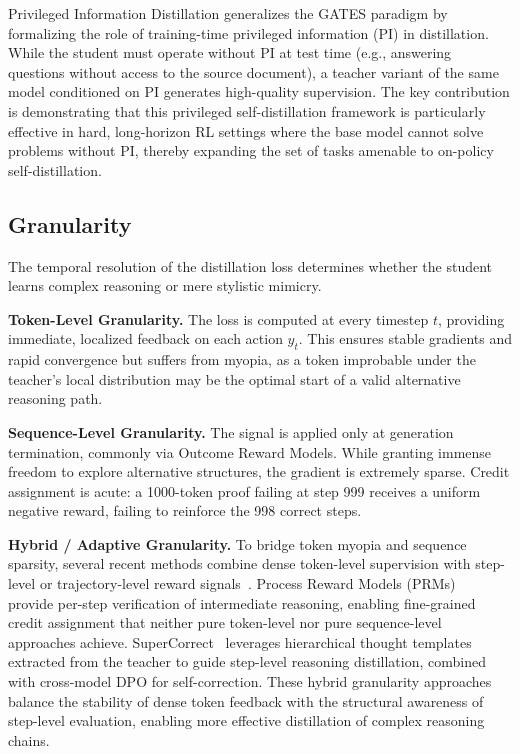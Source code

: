 \documentclass{article} %
\begin{document}
Privileged Information Distillation \citep{2602.04942} generalizes the GATES paradigm by formalizing the role of training-time privileged information (PI) in distillation. While the student must operate without PI at test time (e.g., answering questions without access to the source document), a teacher variant of the same model conditioned on PI generates high-quality supervision. The key contribution is demonstrating that this privileged self-distillation framework is particularly effective in hard, long-horizon RL settings where the base model cannot solve problems without PI, thereby expanding the set of tasks amenable to on-policy self-distillation.

\subsection{Granularity}
\label{subsec:tax_granularity}

The temporal resolution of the distillation loss determines whether the student learns complex reasoning or mere stylistic mimicry.

\textbf{Token-Level Granularity.} The loss is computed at every timestep $t$, providing immediate, localized feedback on each action $y_t$. This ensures stable gradients and rapid convergence but suffers from myopia, as a token improbable under the teacher's local distribution may be the optimal start of a valid alternative reasoning path.

\textbf{Sequence-Level Granularity.} The signal is applied only at generation termination, commonly via Outcome Reward Models. While granting immense freedom to explore alternative structures, the gradient is extremely sparse. Credit assignment is acute: a 1000-token proof failing at step 999 receives a uniform negative reward, failing to reinforce the 998 correct steps.

\textbf{Hybrid / Adaptive Granularity.} To bridge token myopia and sequence sparsity, several recent methods combine dense token-level supervision with step-level or trajectory-level reward signals~\citep{2305.20050,2410.09008,2505.16142,2602.12674}. Process Reward Models (PRMs)~\citep{2305.20050} provide per-step verification of intermediate reasoning, enabling fine-grained credit assignment that neither pure token-level nor pure sequence-level approaches achieve. SuperCorrect~\citep{2410.09008} leverages hierarchical thought templates extracted from the teacher to guide step-level reasoning distillation, combined with cross-model DPO for self-correction. These hybrid granularity approaches balance the stability of dense token feedback with the structural awareness of step-level evaluation, enabling more effective distillation of complex reasoning chains.
\end{document}
